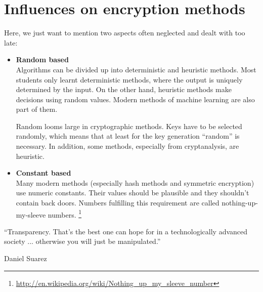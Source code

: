 \section[Influences on encryption methods]{Influences on encryption methods}

\nopagebreak
Here, we just want to mention two aspects often neglected and dealt with too late:

\begin{itemize}

\item {\bf Random based}\\
Algorithms can be divided up into deterministic and heuristic methods. Most students only learnt deterministic methods, where the output is uniquely determined by the input. On the other hand, heuristic methods make decisions using random values. Modern methods of machine learning are also part of them.

Random looms large in cryptographic methods. Keys have to be selected randomly, which means that at least for the key generation ``random'' is necessary. In addition, some methods, especially from cryptanalysis, are heuristic.

\item {\bf Constant based}\\
Many modern methods (especially hash methods and symmetric encryption) use numeric constants. Their values should be plausible and they shouldn't contain back doors. Numbers fulfilling this requirement are called nothing-up-my-sleeve numbers.%
\footnote{\url{http://en.wikipedia.org/wiki/Nothing_up_my_sleeve_number}}

\end{itemize}




\newpage

\begin{ctsquote}
``Transparency. That's the best one can hope for in a technologically advanced society ... otherwise you will just be manipulated.''
\caption[Daniel Suarez]{Daniel Suarez\footnotemark}
\end{ctsquote}
\addtocounter{footnote}{0}

